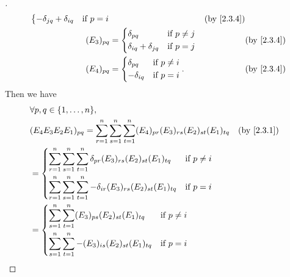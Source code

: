 \begin{proof}[]
\begin{align*}
\begin{dcases}
                                                      -\delta_{j q} + \delta_{i q} & \text{if } p = i
                                                    \end{dcases}    &  & \by{2.3.4}    \\
    (E_3)_{p q}                                 & = \begin{dcases}
                                                      \delta_{p q}                & \text{if } p \neq j \\
                                                      \delta_{i q} + \delta_{j q} & \text{if } p = j
                                                    \end{dcases}     &  & \by{2.3.4}     \\
    (E_4)_{p q}                                 & = \begin{dcases}
                                                      \delta_{p q}  & \text{if } p \neq i \\
                                                      -\delta_{i q} & \text{if } p = i
                                                    \end{dcases}.                   &  & \by{2.3.4}
  \end{align*}
  Then we have
  \begin{align*}
     & \forall p, q \in \set{1, \dots, n},                                                                                                             \\
     & (E_4 E_3 E_2 E_1)_{p q} = \sum_{r = 1}^n \sum_{s = 1}^n \sum_{t = 1}^n (E_4)_{p r} (E_3)_{r s} (E_2)_{s t} (E_1)_{t q}          &  & \by{2.3.1} \\
     & = \begin{dcases}
           \sum_{r = 1}^n \sum_{s = 1}^n \sum_{t = 1}^n \delta_{p r} (E_3)_{r s} (E_2)_{s t} (E_1)_{t q}  & \text{if } p \neq i \\
           \sum_{r = 1}^n \sum_{s = 1}^n \sum_{t = 1}^n -\delta_{i r} (E_3)_{r s} (E_2)_{s t} (E_1)_{t q} & \text{if } p = i
         \end{dcases}                          \\
     & = \begin{dcases}
           \sum_{s = 1}^n \sum_{t = 1}^n (E_3)_{p s} (E_2)_{s t} (E_1)_{t q}  & \text{if } p \neq i \\
           \sum_{s = 1}^n \sum_{t = 1}^n -(E_3)_{i s} (E_2)_{s t} (E_1)_{t q} & \text{if } p = i
         \end{dcases}                                                      \\

\end{align*}
\end{proof}
